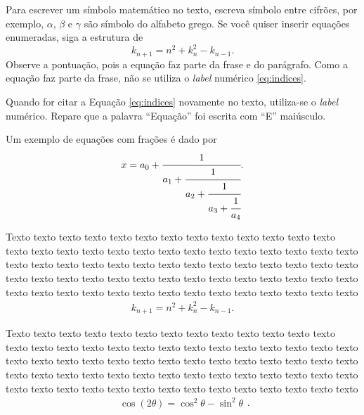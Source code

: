 Para escrever um símbolo matemático no texto, escreva símbolo entre cifrões, por exemplo, $\alpha$, $\beta$ e $\gamma$ são símbolo do alfabeto grego. Se você quiser inserir equações enumeradas, siga a estrutura de
\begin{equation}
    \label{eq:indices}
	k_{n+1} = n^2 + k_n^2 - k_{n-1}.
\end{equation}
Observe a pontuação, pois a equação faz parte da frase e do parágrafo. Como a equação faz parte da frase, não se utiliza o \textit{label} numérico \ref{eq:indices}. 

Quando for citar a Equação \ref{eq:indices} novamente no texto, utiliza-se o \textit{label} numérico. Repare que a palavra ``Equação'' foi escrita com ``E'' maiúsculo. 

Um exemplo de equações com frações é dado por
\begin{equation}
	\label{eq:fracao}
		\begin{aligned}
			x = a_0 + \cfrac{1}{a_1
				+ \cfrac{1}{a_2
					+ \cfrac{1}{a_3 + \cfrac{1}{a_4} } } }.
		\end{aligned}
	\end{equation}

Texto texto texto texto texto texto texto texto texto texto texto texto texto texto texto texto texto texto texto texto texto texto texto texto texto texto texto texto texto texto texto texto texto texto texto texto texto texto texto texto texto texto texto texto texto texto texto texto texto texto texto texto texto texto texto texto texto texto texto texto texto texto texto texto texto texto texto texto texto
	\begin{equation}
		\begin{aligned}
			k_{n+1} = n^2 + k_n^2 - k_{n-1}.
		\end{aligned}
	\end{equation}
	
Texto texto texto texto texto texto texto texto texto texto texto texto texto texto texto texto texto texto texto texto texto texto texto texto texto texto texto texto texto texto texto texto texto texto texto texto texto texto texto texto texto texto texto texto texto texto texto texto texto texto texto texto texto texto texto texto texto texto texto texto texto texto texto texto texto texto texto texto texto
	\begin{equation}
	\label{eq:trigo}
		\begin{aligned}
			\cos (2\theta) = \cos^2 \theta - \sin^2 \theta
		\end{aligned}.
	\end{equation}
	
